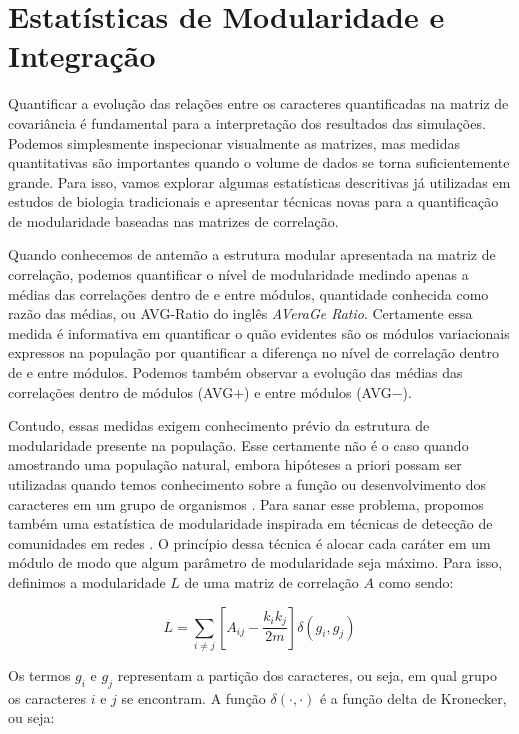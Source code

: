\section{Estatísticas de Modularidade e Integração}

Quantificar a evolução das relações entre os caracteres quantificadas na
matriz de covariância é fundamental para a interpretação dos resultados
das simulações.
Podemos simplesmente inspecionar visualmente as matrizes, mas medidas
quantitativas são importantes quando o volume de dados se torna
suficientemente grande.
Para isso, vamos explorar algumas estatísticas descritivas já utilizadas em
estudos de biologia tradicionais e apresentar técnicas novas para a
quantificação de modularidade baseadas nas matrizes de correlação.

Quando conhecemos de antemão a estrutura modular apresentada na matriz
de correlação, podemos quantificar o nível de modularidade medindo
apenas a médias das correlações dentro de e entre módulos, quantidade
conhecida como razão das médias, ou AVG-Ratio do inglês {\it AVeraGe Ratio}.
Certamente essa medida é informativa em quantificar o quão evidentes são
os módulos variacionais expressos na população por quantificar a
diferença no nível de correlação dentro de e entre módulos.
Podemos também observar a evolução das médias das correlações dentro
de módulos (AVG$+$) e entre módulos (AVG$-$).

Contudo, essas medidas exigem conhecimento prévio da estrutura de
modularidade presente na população.
Esse certamente não é o caso quando amostrando uma população natural,
embora hipóteses a priori possam ser utilizadas quando temos conhecimento
sobre a função ou desenvolvimento dos caracteres em um grupo de
organismos \citep{Cheverud1985a, Marroig2001}.
Para sanar esse problema, propomos também uma estatística de
modularidade inspirada em técnicas de detecção de comunidades em redes
\citep{Newman2006,Newman2006a,Reichardt2006}.
O princípio dessa técnica é alocar cada caráter em um módulo de modo que
algum parâmetro de modularidade seja máximo.
Para isso, definimos a modularidade $L$ de uma matriz de correlação $A$
como sendo:

\begin{equation}
   L = \sum_{i \neq j} \left[ A_{ij} - \frac{k_ik_j}{2m} \right] \delta(g_i, g_j)
\end{equation}

Os termos $g_i$ e $g_j$ representam a partição dos caracteres, ou seja, em
qual grupo os caracteres $i$ e $j$ se encontram.
A função $\delta(\cdot,\cdot)$ é a função delta de Kronecker, ou seja:

